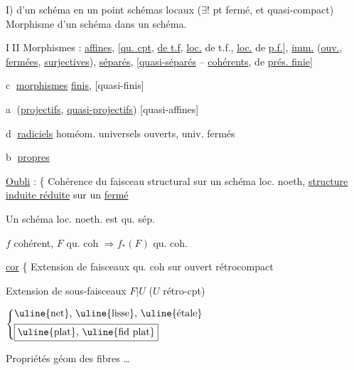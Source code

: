 I)  d'un  schéma en un point schémas locaux ($\exists!$ pt fermé, et quasi-compact) Morphisme d'un schéma  dans un schéma.

\textcircled{III} Morphismes : \uline{affines},  [\uline{qu. cpt}, \uline{de t.f}, \uline{loc.} de t.f., \uline{loc.} de \uline{p.f.}], \uline{imm.} (\uline{ouv.}, \uline{fermées}, \uline{surjectives}), \uline{séparés}, [\uline{quasi-séparés} -- \uline{cohérents}, de \uline{prés. finie}]

\textcircled{c} \uline{morphismes}  \uline{finis}, [quasi-finis]

 \textcircled{a} (\uline{projectifs}, \uline{quasi-projectifs}) [quasi-affines]

\textcircled{d} \uline{radiciels} homéom. universels  ouverts, univ. fermés

\textcircled{b} \uline{propres}


\uline{Oubli} : \{ Cohérence du faisceau structural sur un schéma loc. noeth, \uline{structure induite réduite} sur un \uline{fermé}



Un schéma loc. noeth. est qu. sép.

$f$ cohérent, $F$ qu. coh $\Rightarrow f_*(F)$ qu. coh.

\uline{cor} \{ Extension de faisceaux qu. coh sur ouvert rétrocompact

Extension de sous-faisceaux   $F|U$ ($U$ rétro-cpt)

$\left\{\begin{aligned}
 &\text{\uline{net}, \uline{lisse}, \uline{étale}}\\
 &\boxed{\text{\uline{plat}, \uline{fid plat}}}
\end{aligned}\right.$

Propriétés géom des fibres \ldots


